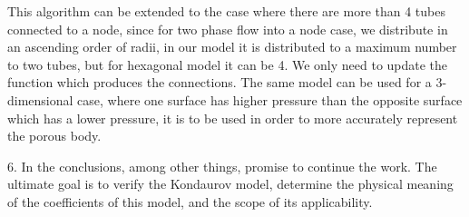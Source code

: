 This algorithm can be extended to the case where there are more than 4 tubes connected to a node, since for two phase flow into a node case, we distribute in an ascending order of radii, in our model it is distributed to a maximum number to two tubes, but for hexagonal model it can be 4. We only need to update the function which produces the connections. The same model can be used for a 3-dimensional case, where one surface has higher pressure than the opposite surface which has a lower pressure, it is to be used in order to more accurately represent the porous body.

6. In the conclusions, among other things, promise to continue the work. The ultimate goal is to verify the Kondaurov model, determine the physical meaning of the coefficients of this model, and the scope of its applicability.




